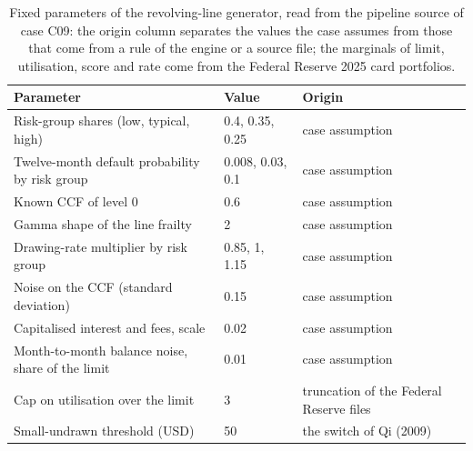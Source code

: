 \begin{table}[htbp]
\centering
\small
\caption{Fixed parameters of the revolving-line generator, read from the pipeline source of case C09: the origin column separates the values the case assumes from those that come from a rule of the engine or a source file; the marginals of limit, utilisation, score and rate come from the Federal Reserve 2025 card portfolios.}
\label{tab:lgd-ead-generator}
\begin{tabular}{p{6.6cm}lp{4.6cm}}
\toprule
Parameter & Value & Origin \\
\midrule
Risk-group shares (low, typical, high) & 0.4, 0.35, 0.25 & case assumption \\
Twelve-month default probability by risk group & 0.008, 0.03, 0.1 & case assumption \\
Known CCF of level 0 & 0.6 & case assumption \\
Gamma shape of the line frailty & 2 & case assumption \\
Drawing-rate multiplier by risk group & 0.85, 1, 1.15 & case assumption \\
Noise on the CCF (standard deviation) & 0.15 & case assumption \\
Capitalised interest and fees, scale & 0.02 & case assumption \\
Month-to-month balance noise, share of the limit & 0.01 & case assumption \\
Cap on utilisation over the limit & 3 & truncation of the Federal Reserve files \\
Small-undrawn threshold (USD) & 50 & the switch of Qi (2009) \\
\bottomrule
\end{tabular}
\end{table}

